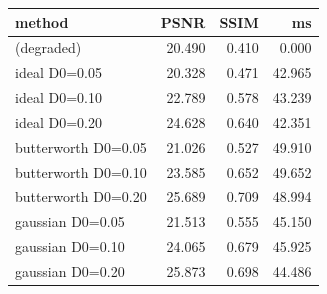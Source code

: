 \begin{tabular}{lrrr}
\toprule
method & PSNR & SSIM & ms \\
\midrule
(degraded) & 20.490 & 0.410 & 0.000 \\
ideal D0=0.05 & 20.328 & 0.471 & 42.965 \\
ideal D0=0.10 & 22.789 & 0.578 & 43.239 \\
ideal D0=0.20 & 24.628 & 0.640 & 42.351 \\
butterworth D0=0.05 & 21.026 & 0.527 & 49.910 \\
butterworth D0=0.10 & 23.585 & 0.652 & 49.652 \\
butterworth D0=0.20 & 25.689 & 0.709 & 48.994 \\
gaussian D0=0.05 & 21.513 & 0.555 & 45.150 \\
gaussian D0=0.10 & 24.065 & 0.679 & 45.925 \\
gaussian D0=0.20 & 25.873 & 0.698 & 44.486 \\
\bottomrule
\end{tabular}
